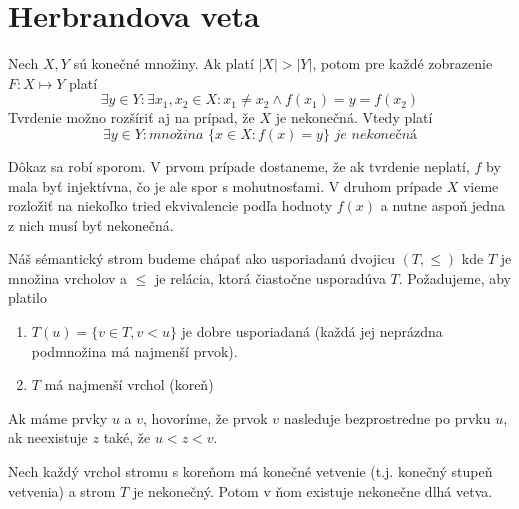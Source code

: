 \section{Herbrandova veta}

\begin{lema}
    Nech $X,Y$ sú konečné množiny. Ak platí
    $|X| > |Y|$, potom pre každé zobrazenie
    $F:X \mapsto Y$ platí
    \begin{equation*}
        \exists y \in Y:
            \exists x_1,x_2 \in X:
                x_1 \ne x_2 \land f(x_1)=y=f(x_2)
    \end{equation*}
    Tvrdenie možno rozšíriť aj na prípad, že $X$ je nekonečná.
    Vtedy platí
    \begin{equation*}
        \exists y\in Y:
            \textit{množina }\{ x\in X: f(x)=y \}
            \textit{ je nekonečná}
    \end{equation*}
\end{lema}
\begin{dokaz}
    Dôkaz sa robí sporom. V prvom prípade dostaneme, že ak tvrdenie
    neplatí, $f$ by mala byť injektívna, čo je ale spor s
    mohutnosťami. V druhom prípade $X$ vieme rozložiť na niekoľko
    tried ekvivalencie podľa hodnoty $f(x)$ a nutne aspoň jedna z nich
    musí byť nekonečná.
\end{dokaz}

\begin{definicia}
    Náš sémantický strom budeme chápať ako usporiadanú dvojicu 
    $(T,\le)$ kde $T$ je množina vrcholov a $\le$ je relácia,
    ktorá čiastočne usporadúva $T$.
    Požadujeme, aby platilo

    \begin{enumerate}
	\item $T(u)=\{v\in T, v<u\}$ je dobre usporiadaná 
            (každá jej neprázdna podmnožina má najmenší prvok).

	\item $T$ má najmenší vrchol (koreň)
    \end{enumerate}

    Ak máme prvky $u$ a $v$, hovoríme, že prvok $v$ nasleduje
    bezprostredne po prvku $u$, ak neexistuje $z$ také, že $u < z < v$.
\end{definicia}

\begin{lema}[K\"onig] 
    Nech každý vrchol stromu s koreňom má konečné vetvenie
    (t.j. konečný stupeň vetvenia) a strom $T$ je nekonečný.
    Potom v ňom existuje nekonečne dlhá vetva.
\end{lema}

